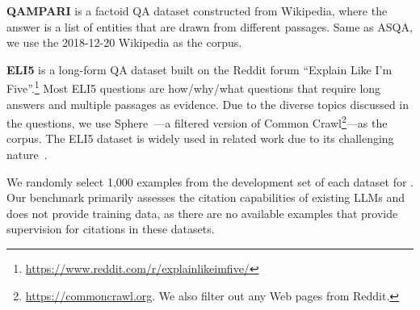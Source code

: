 \textbf{QAMPARI} \cite{rubin2022qampari}  
is a factoid QA dataset constructed from Wikipedia,
where the answer is a list of entities that are  drawn from different passages.
Same as ASQA, we use the 2018-12-20 Wikipedia as the corpus.%


\textbf{ELI5} \cite{fan-etal-2019-eli5} 
is a long-form QA dataset built on the Reddit forum ``Explain Like I'm Five''.\footnote{\url{https://www.reddit.com/r/explainlikeimfive/}} %
Most ELI5 questions are how/why/what questions that require long answers and multiple passages as evidence.
Due to the diverse topics discussed in the questions, we use
Sphere~\cite{piktus2021web}---a filtered version of Common Crawl\footnote{\url{https://commoncrawl.org}. We also filter out any Web pages from Reddit. }---as the corpus. %
The ELI5 dataset is widely used in related work due to its challenging nature~\cite{nakano2021webgpt,menick2022teaching,liu2023evaluating}.



We randomly select 1,000 examples from the development set of each dataset for \citeeval{}.
Our benchmark primarily assesses the citation capabilities of existing LLMs and does not provide training data,
as
there are no available examples that provide supervision for citations
in these datasets.
